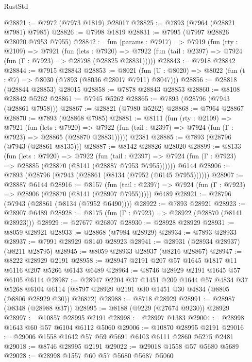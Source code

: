 \begin{lexlean}{RustStd}
\begin{coremodule}
@28821 := @7972 (@7973 @1819) @28017
@28825 := @7893 (@7964 (@28821 @7981) @7985)
@28826 := @7998 @1819
@28831 := @7995 (@7997 @28826 @28020 @7953 @7955)
@28842 := fun (params : @7917) =>
  @7919
    (fun (rty : @2109) =>
    @7921
      (fun (lets : @7920) =>
      @7922 (fun (tail : @2397) => @7924 (fun (Γ : @7923) => @28798 (@28825 @28831)))))
@28843 := @7918 @28842
@28844 := @7915 @28843
@28853 := @8021
    (fun (U : @8020) => @8022 (fun (t : @7) => @8030 (@7893 (@8036 @28017 @7911) @8047)))
@28856 := @28818 (@28844 @28853) @28015
@28858 := @7878 @28843 @28853
@28860 := @8108 @28842 @5262
@28861 := @7945 @5262
@28865 := @7893 (@28796 (@7943 (@28861 @7958)))
@28867 := @28821 (@7980 @5262)
@28868 := @7964 @28867
@28870 := @7893 (@28868 @7985)
@28881 := @8111
    (fun (rty : @2109) =>
    @7921
      (fun (lets : @7920) =>
      @7922 (fun (tail : @2397) => @7924 (fun (Γ : @7923) => @28865 (@28870 @28831)))))
    @2381
@28885 := @7893 (@28796 (@7943 (@28861 @8135)))
@28887 := @8142 @28826 @28020
@28899 := @8133
    (fun (lets : @7920) =>
    @7922
      (fun (tail : @2397) =>
      @7924 (fun (Γ : @7923) => @28885 (@28870 (@8141 (@28887 @7953 @7955))))))
    @6144
@28906 := @7893 (@28796 (@7943 (@28861 (@8134 (@7952 (@6145 @7955))))))
@28907 := @28887 @6144
@28916 := @8157
    (fun (tail : @2397) => @7924 (fun (Γ : @7923) => @28906 (@28870 (@8141 (@28907 @7955)))))
    @6489
@28921 := @28796 (@7943 (@28861 (@8134 (@7952 @6490))))
@28922 := @7893 @28921
@28923 := @28907 @6489
@28928 := @8175 (fun (Γ : @7923) => @28922 (@28870 (@8141 @28923)))
@28929 := @27677 @26807
@28930 := @28928 @28929
@28931 := @8059 @28921
@28933 := @28868 (@7984 @28929)
@28934 := @7893 @28933
@28937 := @7991 @28929 @8140 @28923
@28941 := @28931 (@28934 @28937) (@8211 @28795)
@28945 := @8059 @28933 @28937 (@8216 @28867)
@28947 := @8222 @28929 @2191
@28958 := @28947 @2191 @207 @57 @1645 @1817 @11 @6116 @207 @5266 @6143 @6489
@28964 := @8746 @28929 @2191 @1645 @57 @6105 @6114
@28987 := @28947
    @2204
    @37
    @1451
    @209
    @1644
    @57
    @4834
    @37
    @5268
    @6104
    @6114
    (@8797 @28929 @2191 @30 @1451 @30 @4834 (@8805 (@8806 @28929 @30)) @26872)
@28988 := @8718 @28929
@28991 := @28987 (@8348 (@28988 @37))
@28995 := @8188 (@9229 (@27674 @9230)) @28929
@28997 := @10857 @28995 @2191
@28998 := @28997 @1383
@29004 := @28998 @1643 @60 @57 @6104 @6112 @5060
@29006 := @10870 @28995 @2191
@29016 := @29006 @1558 @1642 @57 @59 @5691 @6103 @6111 @2860 @5275 @2481
@29018 := @8746 @28995 @2191
@29022 := @29018 @1558 @57 @5680 @5689
@29028 := @28998 @1557 @60 @57 @5680 @5687 @5060

\end{coremodule}
\end{lexlean}
